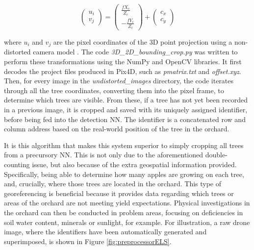 \documentclass[journal]{IEEEtran}
\begin{document}
\begin{equation}
\begin{pmatrix} u_{i} \\ v_{j} \end{pmatrix} 
= 
\begin{pmatrix} \frac{fX_{c}}{Z_{c}} \\ - \frac{fY_{c}}{Z_{c}} \end{pmatrix} 
+
\begin{pmatrix} c_{x} \\ c_{y} \end{pmatrix}
\label{pixelcoords}
\end{equation}

where $u_{i}$ and $v_{j}$ are the pixel coordinates of the 3D point projection using a non-distorted camera model \cite{nondistortedcameramodel}. The code \textit{3D\_2D\_bounding\_crop.py} was written to perform these transformations using the NumPy and OpenCV libraries. It first decodes the project files produced in Pix4D, such as \textit{pmatrix.txt} and \textit{offset.xyz}. Then, for every image in the \textit{undistorted\_images} directory, the code iterates through all the tree coordinates, converting them into the pixel frame, to determine which trees are visible. From these, if a tree has not yet been recorded in a previous image, it is cropped and saved with its uniquely assigned identifier, before being fed into the detection NN. The identifier is a concatenated row and column address based on the real-world position of the tree in the orchard. 

It is this algorithm that makes this system superior to simply cropping all trees from a precursory NN. This is not only due to the aforementioned double-counting issue, but also because of the extra geospatial information provided. Specifically, being able to determine how many apples are growing on each tree, and, crucially, where those trees are located in the orchard. This type of georeferencing is beneficial because it provides data regarding which trees or areas of the orchard are not meeting yield expectations. Physical investigations in the orchard can then be conducted in problem areas, focusing on deficiencies in soil water content, minerals or sunlight, for example. For illustration, a raw drone image, where the identifiers have been automatically generated and superimposed, is shown in Figure \ref{fig:preprocessorELS}.
\end{document}
